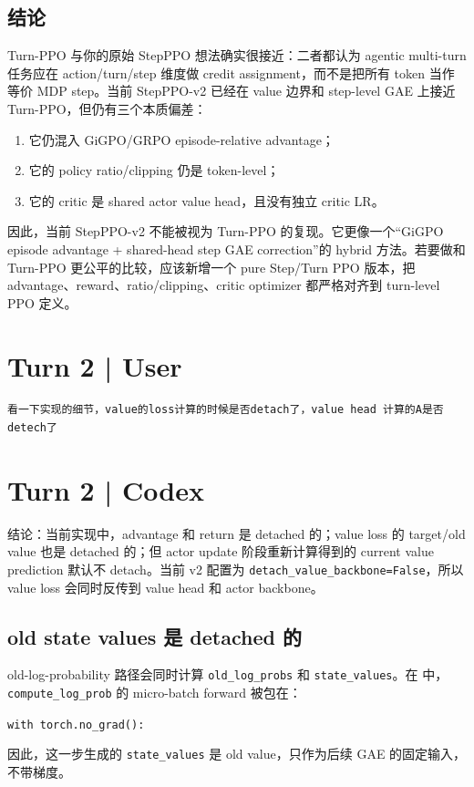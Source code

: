 \documentclass[10pt]{ctexart}
\newcommand{\code}[1]{\texttt{#1}}
\begin{document}
\subsection*{结论}
Turn-PPO 与你的原始 StepPPO 想法确实很接近：二者都认为 agentic multi-turn 任务应在 action/turn/step 维度做 credit assignment，而不是把所有 token 当作等价 MDP step。当前 StepPPO-v2 已经在 value 边界和 step-level GAE 上接近 Turn-PPO，但仍有三个本质偏差：
\begin{enumerate}
  \item 它仍混入 GiGPO/GRPO episode-relative advantage；
  \item 它的 policy ratio/clipping 仍是 token-level；
  \item 它的 critic 是 shared actor value head，且没有独立 critic LR。
\end{enumerate}

因此，当前 StepPPO-v2 不能被视为 Turn-PPO 的复现。它更像一个“GiGPO episode advantage + shared-head step GAE correction”的 hybrid 方法。若要做和 Turn-PPO 更公平的比较，应该新增一个 pure Step/Turn PPO 版本，把 advantage、reward、ratio/clipping、critic optimizer 都严格对齐到 turn-level PPO 定义。

\section*{Turn 2 | User}
\begin{Verbatim}[breaklines=true,breakanywhere=true]
看一下实现的细节，value的loss计算的时候是否detach了，value head 计算的A是否detech了
\end{Verbatim}

\section*{Turn 2 | Codex}
结论：当前实现中，advantage 和 return 是 detached 的；value loss 的 target/old value 也是 detached 的；但 actor update 阶段重新计算得到的 current value prediction 默认不 detach。当前 v2 配置为 \code{detach\_value\_backbone=False}，所以 value loss 会同时反传到 value head 和 actor backbone。

\subsection*{old state values 是 detached 的}
old-log-probability 路径会同时计算 \code{old\_log\_probs} 和 \code{state\_values}。在  中，\code{compute\_log\_prob} 的 micro-batch forward 被包在：
\begin{center}
\code{with torch.no\_grad():}
\end{center}
因此，这一步生成的 \code{state\_values} 是 old value，只作为后续 GAE 的固定输入，不带梯度。
\end{document}
